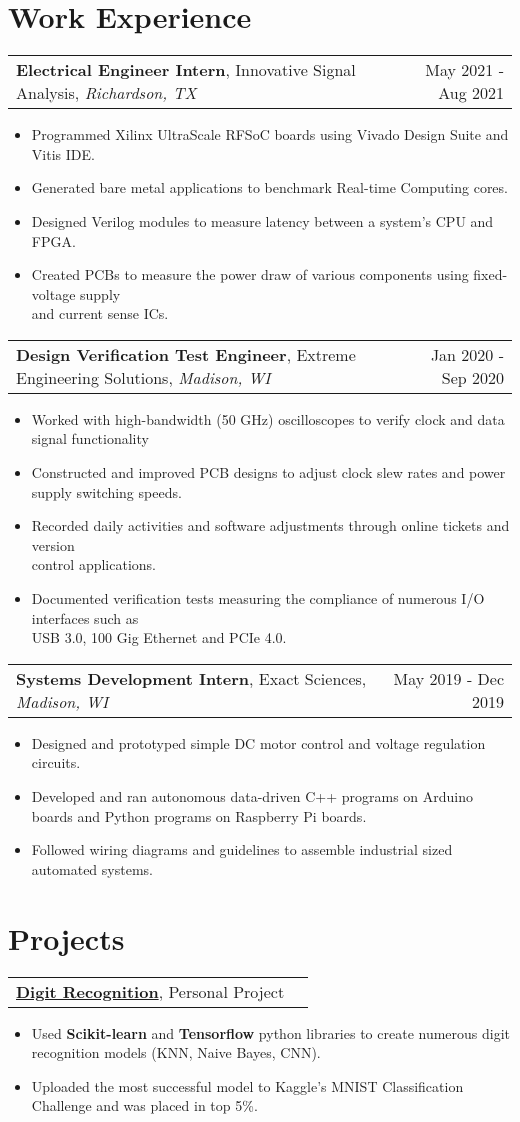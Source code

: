 \documentclass[letterpaper,11pt]{article}
\makeatletter
\newcommand{\exptitle}[4]{
  \vspace{7pt}
  \begin{tabular*}{1.00\textwidth}[t]{l@{\extracolsep{\fill}}r}
    \textbf{#1}, #2, \textit{#3} & #4 \\
  \end{tabular*}\vspace{-5pt}
}
\newcommand{\projtitle}[2]{
  \vspace{7pt}
  \begin{tabular*}{1.00\textwidth}[t]{l@{\extracolsep{\fill}}r}
    \textbf{#1}, #2 \\
  \end{tabular*}\vspace{-5pt}
}
\newcommand{\expstart}{\begin{itemize}[leftmargin=5mm]}
\newcommand{\expend}{\end{itemize}\vspace{-5pt}}
\newcommand{\expitem}[1]{\item\small{{#1 \vspace{-5pt}}}}
\makeatother
\begin{document}
\section{Work 
Experience}
 \vspace{-6pt}
  \exptitle{Electrical Engineer Intern}{Innovative Signal Analysis}{Richardson, TX}{May 2021 - Aug 2021}
  \expstart
    \expitem{Programmed Xilinx UltraScale RFSoC boards using Vivado Design Suite and Vitis IDE.}
    \expitem{Generated bare metal applications to benchmark Real-time Computing cores.}
    \expitem{Designed Verilog modules to measure latency between a system’s CPU and FPGA.}
    \expitem{Created PCBs to measure the power draw of various components using fixed-voltage supply \\ and current sense ICs.}
  \expend
  
  \exptitle{Design Verification Test Engineer}{Extreme Engineering Solutions}{Madison, WI}{Jan 2020 - Sep 2020}
  \expstart
    \expitem{Worked with high-bandwidth (50 GHz) oscilloscopes to verify clock and data signal functionality}
    \expitem{Constructed and improved PCB designs to adjust clock slew rates and power supply switching speeds.}
    \expitem{Recorded daily activities and software adjustments through online tickets and version \\ control applications.}
    \expitem{Documented verification tests measuring the compliance of numerous I/O interfaces such as \\ USB 3.0, 100 Gig Ethernet and PCIe 4.0.}
  \expend
  
  \exptitle{Systems Development Intern}{Exact Sciences}{Madison, WI}{May 2019 - Dec 2019}
  \expstart
    \expitem{Designed and prototyped simple DC motor control and voltage regulation circuits.}
    \expitem{Developed and ran autonomous data-driven C++ programs on Arduino \\ boards and Python programs on Raspberry Pi boards.}
    \expitem{Followed wiring diagrams and guidelines to assemble industrial sized automated systems.}
  \expend

\section{Projects}
  \vspace{-6pt}
  \projtitle{\href{https://github.com/jth1011/Digit-Recognizer}{Digit Recognition}}{Personal Project}
  \expstart
    \expitem{Used \textbf{Scikit-learn} and \textbf{Tensorflow} python libraries to create numerous digit recognition models (KNN, Naive Bayes, CNN).}
    \expitem{Uploaded the most successful model to Kaggle's MNIST Classification Challenge and was placed in top 5\%.}
  \expend
  
\end{document}
